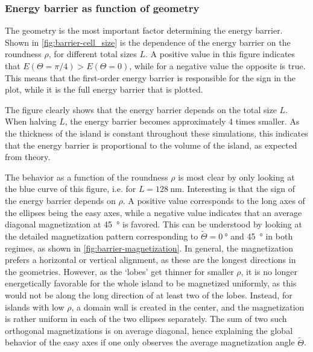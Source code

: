\documentclass[11pt,a4paper,english]{article}
\begin{document}
\subsubsection{Energy barrier as function of geometry}
The geometry is the most important factor determining the energy barrier. Shown in \cref{fig:barrier-cell_size} is the dependence of the energy barrier on the roundness $\rho$, for different total sizes $L$. A positive value in this figure indicates that $E(\Theta=\pi/4) > E(\Theta=0)$, while for a negative value the opposite is true. This means that the first-order energy barrier is responsible for the sign in the plot, while it is the full energy barrier that is plotted. \par
The figure clearly shows that the energy barrier depends on the total size $L$. When halving $L$, the energy barrier becomes approximately 4 times smaller. As the thickness of the island is constant throughout these simulations, this indicates that the energy barrier is proportional to the volume of the island, as expected from theory. \par
The behavior as a function of the roundness $\rho$ is most clear by only looking at the blue curve of this figure, i.e. for $L=\SI{128}{\nano\metre}$. Interesting is that the sign of the energy barrier depends on $\rho$. A positive value corresponds to the long axes of the ellipses being the easy axes, while a negative value indicates that an average diagonal magnetization at \SI{45}{\degree} is favored. This can be understood by looking at the detailed magnetization pattern corresponding to $\widetilde{\Theta} = \SI{0}{\degree}$ and \SI{45}{\degree} in both regimes, as shown in \cref{fig:barrier-magnetization}. In general, the magnetization prefers a horizontal or vertical alignment, as these are the longest directions in the geometries. However, as the `lobes' get thinner for smaller $\rho$, it is no longer energetically favorable for the whole island to be magnetized uniformly, as this would not be along the long direction of at least two of the lobes. Instead, for islands with low $\rho$, a domain wall is created in the center, and the magnetization is rather uniform in each of the two ellipses separately. The sum of two such orthogonal magnetizations is on average diagonal, hence explaining the global behavior of the easy axes if one only observes the average magnetization angle $\widetilde{\Theta}$.
\end{document}
